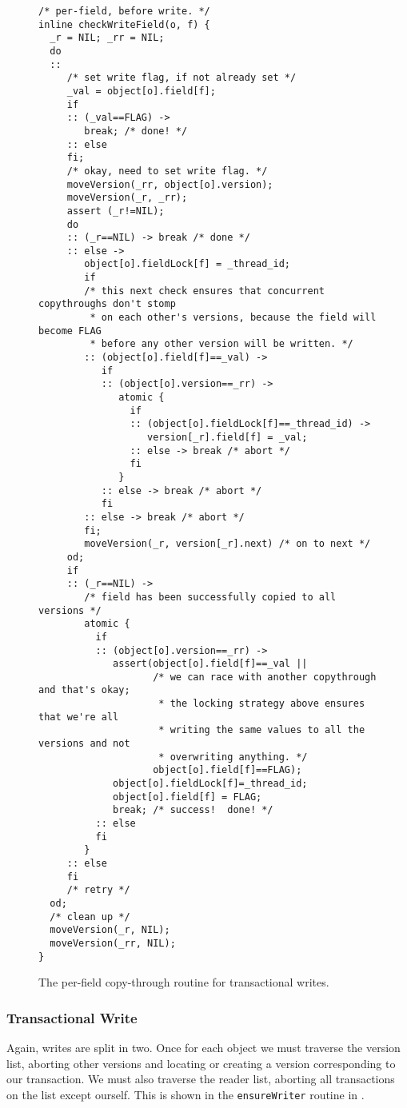 \documentclass{csa-sig-alternate}
\begin{document}
\begin{figure}
\fontsize{6.5}{8}
\begin{verbatim}
/* per-field, before write. */
inline checkWriteField(o, f) {
  _r = NIL; _rr = NIL;
  do
  ::
     /* set write flag, if not already set */
     _val = object[o].field[f];
     if
     :: (_val==FLAG) ->
        break; /* done! */
     :: else
     fi;
     /* okay, need to set write flag. */
     moveVersion(_rr, object[o].version);
     moveVersion(_r, _rr);
     assert (_r!=NIL);
     do
     :: (_r==NIL) -> break /* done */
     :: else ->
        object[o].fieldLock[f] = _thread_id;
        if
        /* this next check ensures that concurrent copythroughs don't stomp
         * on each other's versions, because the field will become FLAG
         * before any other version will be written. */
        :: (object[o].field[f]==_val) ->
           if
           :: (object[o].version==_rr) ->
              atomic {
                if
                :: (object[o].fieldLock[f]==_thread_id) ->
                   version[_r].field[f] = _val;
                :: else -> break /* abort */
                fi
              }
           :: else -> break /* abort */
           fi
        :: else -> break /* abort */
        fi;
        moveVersion(_r, version[_r].next) /* on to next */
     od;
     if
     :: (_r==NIL) ->
        /* field has been successfully copied to all versions */
        atomic {
          if
          :: (object[o].version==_rr) ->
             assert(object[o].field[f]==_val ||
                    /* we can race with another copythrough and that's okay;
                     * the locking strategy above ensures that we're all
                     * writing the same values to all the versions and not
                     * overwriting anything. */
                    object[o].field[f]==FLAG);
             object[o].fieldLock[f]=_thread_id;
             object[o].field[f] = FLAG;
             break; /* success!  done! */
          :: else
          fi
        }
     :: else
     fi
     /* retry */
  od;
  /* clean up */
  moveVersion(_r, NIL);
  moveVersion(_rr, NIL);
}
\end{verbatim}
\figadjust%
\caption{The per-field copy-through routine for transactional writes.}
\label{fig:copythrough}
\end{figure}
\subsubsection{Transactional Write}
Again, writes are split in two.  Once for each object we must traverse
the version list, aborting other versions and locating or creating a
version corresponding to our transaction.  We must also traverse the
reader list, aborting all transactions on the list except ourself.
This is shown in the {\tt ensureWriter} routine in .
\end{document}
